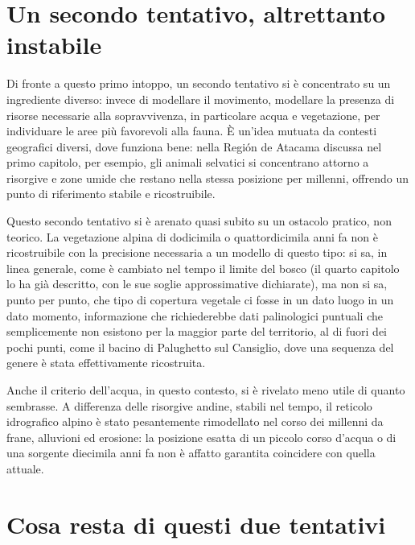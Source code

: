 \section{Un secondo tentativo, altrettanto instabile}

Di fronte a questo primo intoppo, un secondo tentativo si è concentrato su un ingrediente diverso: invece di modellare il movimento, modellare la presenza di risorse necessarie alla sopravvivenza, in particolare acqua e vegetazione, per individuare le aree più favorevoli alla fauna. È un'idea mutuata da contesti geografici diversi, dove funziona bene: nella Región de Atacama discussa nel primo capitolo, per esempio, gli animali selvatici si concentrano attorno a risorgive e zone umide che restano nella stessa posizione per millenni, offrendo un punto di riferimento stabile e ricostruibile.

Questo secondo tentativo si è arenato quasi subito su un ostacolo pratico, non teorico. La vegetazione alpina di dodicimila o quattordicimila anni fa non è ricostruibile con la precisione necessaria a un modello di questo tipo: si sa, in linea generale, come è cambiato nel tempo il limite del bosco (il quarto capitolo lo ha già descritto, con le sue soglie approssimative dichiarate), ma non si sa, punto per punto, che tipo di copertura vegetale ci fosse in un dato luogo in un dato momento, informazione che richiederebbe dati palinologici puntuali che semplicemente non esistono per la maggior parte del territorio, al di fuori dei pochi punti, come il bacino di Palughetto sul Cansiglio, dove una sequenza del genere è stata effettivamente ricostruita.

Anche il criterio dell'acqua, in questo contesto, si è rivelato meno utile di quanto sembrasse. A differenza delle risorgive andine, stabili nel tempo, il reticolo idrografico alpino è stato pesantemente rimodellato nel corso dei millenni da frane, alluvioni ed erosione: la posizione esatta di un piccolo corso d'acqua o di una sorgente diecimila anni fa non è affatto garantita coincidere con quella attuale.

\section{Cosa resta di questi due tentativi}

